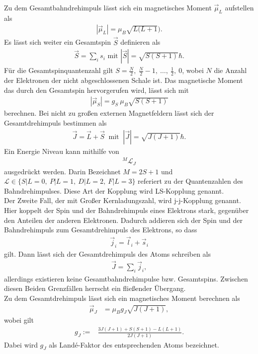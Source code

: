 Zu dem Gesamtbahndrehimpuls lässt sich ein magnetisches Moment $\vec{\mu}_L$ aufstellen als
\begin{align}
	|\vec{\mu}_L|=\mu_B\sqrt{L(L+1}).
\end{align}
Es lässt sich weiter ein Gesamtspin $\vec{S}$ definieren als
\begin{align}
	\vec{S}=\sum_is_i \text{ mit } |\vec{S}|=\sqrt{S(S+1)}\hbar.
\end{align}
Für die Gesamtspinquantenzahl gilt $S=\frac{N}{2},\ \frac{N}{2}-1 ,\ \dots,\ \frac{1}{2},\ 0$, wobei $N$ die Anzahl der Elektronen der nicht abgeschlossenen Schale ist.
Das magnetische Moment das durch den Gesamtspin hervorgerufen wird, lässt sich mit
\begin{align}
	|\vec{\mu}_S|=g_S\ \mu_B\sqrt{S(S+1)}
\end{align}
berechnen.
Bei nicht zu großen externen Magnetfeldern lässt sich der Gesamtdrehimpuls bestimmen als
\begin{align}
	\vec{J}=\vec{L}+\vec{S} \ \text{ mit }\ |\vec{J}|=\sqrt{J(J+1)}\hbar.
\end{align}
Ein Energie Niveau kann mithilfe von 
\begin{align}
	{}^M\mathcal{L}_J
\end{align}
ausgedrückt werden.
Darin Bezeichnet $M=2S+1$ und $\mathcal{L}\in\{S|L=0,\ P|L=1,\ D|L=2,\ F|L=3\}$ referiert zu der Quantenzahlen des Bahndrehimpulses.
Diese Art der Kopplung wird LS-Kopplung genannt.\\
Der Zweite Fall, der mit Großer Kernladungszahl, wird j-j-Kopplung genannt.
Hier koppelt der Spin und der Bahndrehimpuls eines Elektrons stark, gegenüber den Anteilen der anderen Elektronen.
Dadurch addieren sich der Spin und der Bahndrehimpuls zum Gesamtdrehimpuls des Elektrons, so dass 
\begin{align}
	\vec{j}_i=\vec{l}_i+\vec{s}_i
\end{align}
gilt.
Dann lässt sich der Gesamtdrehimpuls des Atoms schreiben als
\begin{align}
	\vec{J}=\sum_i\vec{j}_i,
\end{align}
allerdings existieren keine Gesamtbahndrehimpulse bzw. Gesamtspins.
Zwischen diesen Beiden Grenzfällen herrscht ein fließender Übergang.\\
Zu dem Gesamtdrehimpuls lässt sich ein magnetisches Moment berechnen als
\begin{align}
	\vec{\mu}_J&=\mu_Bg_J\sqrt{J(J+1)},
\end{align}
wobei gilt
\begin{align}
		g_J:=&\frac{3J(J+1)+S(S+1)-L(L+1)}{2J(J+1)}.
\end{align}
Dabei wird $g_J$ als Landé-Faktor des entsprechenden Atoms bezeichnet.
